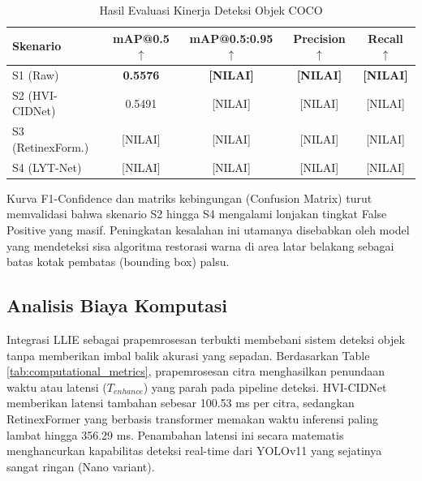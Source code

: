 \documentclass[conference]{IEEEtran}
\begin{document}
\begin{table}[htbp]
\caption{Hasil Evaluasi Kinerja Deteksi Objek COCO}
\begin{center}
\begin{tabular}{|l|c|c|c|c|}
\hline
\textbf{Skenario} & \textbf{mAP@0.5 $\uparrow$} & \textbf{mAP@0.5:0.95 $\uparrow$} & \textbf{Precision $\uparrow$} & \textbf{Recall $\uparrow$} \\
\hline
S1 (Raw) & \textbf{0.5576} & \textbf{[NILAI]} & \textbf{[NILAI]} & \textbf{[NILAI]} \\
\hline
S2 (HVI-CIDNet) & 0.5491 & [NILAI] & [NILAI] & [NILAI] \\
\hline
S3 (RetinexForm.) & [NILAI] & [NILAI] & [NILAI] & [NILAI] \\
\hline
S4 (LYT-Net) & [NILAI] & [NILAI] & [NILAI] & [NILAI] \\
\hline
\end{tabular}
\label{tab:detection_metrics}
\end{center}
\end{table}


Kurva F1-Confidence dan matriks kebingungan (Confusion Matrix) turut memvalidasi bahwa skenario S2 hingga S4 mengalami lonjakan tingkat False Positive yang masif. Peningkatan kesalahan ini utamanya disebabkan oleh model yang mendeteksi sisa algoritma restorasi warna di area latar belakang sebagai batas kotak pembatas (bounding box) palsu.

\subsection{Analisis Biaya Komputasi}
Integrasi LLIE sebagai prapemrosesan terbukti membebani sistem deteksi objek tanpa memberikan imbal balik akurasi yang sepadan. Berdasarkan Table \ref{tab:computational_metrics}, prapemrosesan citra menghasilkan penundaan waktu atau latensi ($T_{enhance}$) yang parah pada pipeline deteksi. HVI-CIDNet memberikan latensi tambahan sebesar 100.53 ms per citra, sedangkan RetinexFormer yang berbasis transformer memakan waktu inferensi paling lambat hingga 356.29 ms. Penambahan latensi ini secara matematis menghancurkan kapabilitas deteksi real-time dari YOLOv11 yang sejatinya sangat ringan (Nano variant).
\end{document}
